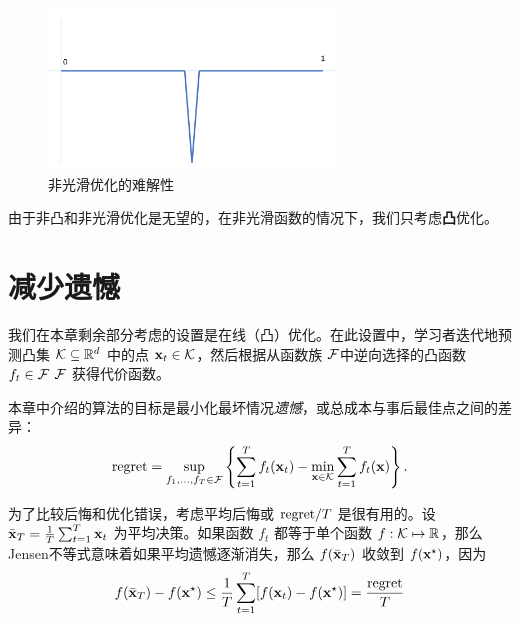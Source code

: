 \begin{figure}[h!]
\begin{center}
\includegraphics[width=3in]{figs/nonsmooth}
\end{center}
\caption{
	非光滑优化的难解性
	\label{fig:nonsmooth}}
\end{figure}


由于非凸和非光滑优化是无望的，在非光滑函数的情况下，我们只考虑{\bf 凸}优化。

\section{
	减少遗憾
	} 


我们在本章剩余部分考虑的设置是在线（凸）优化。在此设置中，学习者迭代地预测凸集 $\mathcal K \subseteq {\mathbb R}^d$ 中的点 $\mathbf x_t \in \mathcal K$，然后根据从函数族 ${\mathcal F}$中逆向选择的凸函数 $f_t \in {\mathcal F}$ ${\mathcal F}$ 获得代价函数。

本章中介绍的算法的目标是最小化最坏情况{\it 遗憾}，或总成本与事后最佳点之间的差异：
$$ \mathrm{{regret}} = \sup_{f_1,...,f_T \in {\mathcal F}} \left\{ \sum_{t=1}^{T} f_t(\mathbf{x}_t) -\min_{\mathbf{x} \in \mathcal K}\sum_{t=1}^{T} f_t(\mathbf{x}) \right\} . $$


为了比较后悔和优化错误，考虑平均后悔或  ${\mathrm{{regret}}}/{T} $ 是很有用的。设 $\bar{\mathbf x}_T = \frac{1}{T} \sum_{t=1}^T \mathbf x_t$ 为平均决策。如果函数 $f_t$ 都等于单个函数 $f : \mathcal K\mapsto {\mathbb R}$，那么Jensen不等式意味着如果平均遗憾逐渐消失，那么 $f( \bar{\mathbf x}_T)$ 收敛到 $f(\mathbf x^\star)$，因为
$$ f(\bar{\mathbf x}_T) - f(\mathbf x^\star ) \leq \frac{1}{T} \sum_{t=1} ^T [f(\mathbf x_t)  - f(\mathbf x^\star) ] = \frac{\mathrm{{regret}}}{T} $$ 


